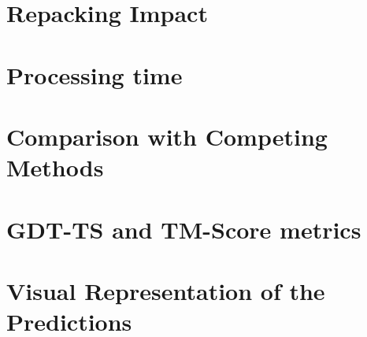 \section{Repacking Impact}

\section{Processing time}

\section{Comparison with Competing Methods}



\section{GDT-TS and TM-Score metrics}

\section{Visual Representation of the Predictions}

